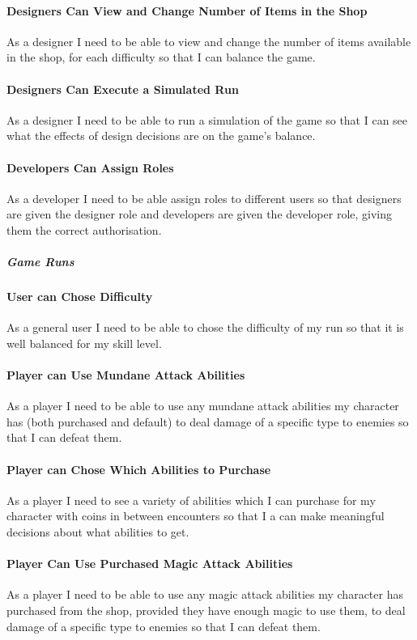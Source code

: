 \paragraph{Designers Can View and Change Number of Items in the Shop}
As a designer I need to be able to view and change the number of items available in the shop, for each difficulty so that I can balance the game.

\paragraph{Designers Can Execute a Simulated Run}
As a designer I need to be able to run a simulation of the game so that I can see what the effects of design decisions are on the game's balance.

\paragraph{Developers Can Assign Roles}
As a developer I need to be able assign roles to different users so that designers are given the designer role and developers are given the developer role, giving them the correct authorisation.

\subparagraph{Game Runs}

\paragraph{User can Chose Difficulty}
As a general user I need to be able to chose the difficulty of my run so that it is well balanced for my skill level.

\paragraph{Player can Use Mundane Attack Abilities}
As a player I need to be able to use any mundane attack abilities my character has (both purchased and default) to deal damage of a specific type to enemies so that I can defeat them.

\paragraph{Player can Chose Which Abilities to Purchase}
As a player I need to see a variety of abilities which I can purchase for my character with coins in between encounters so that I a can make meaningful decisions about what abilities to get.

\paragraph{Player Can Use Purchased Magic Attack Abilities}
As a player I need to be able to use any magic attack abilities my character has purchased from the shop, provided they have enough magic to use them, to deal damage of a specific type to enemies so that I can defeat them.

